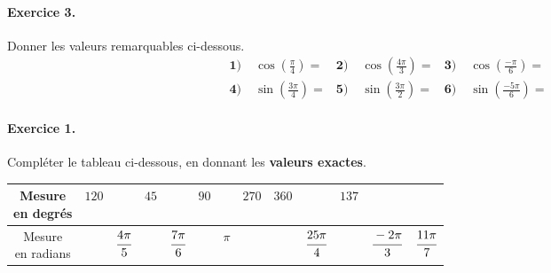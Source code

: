 \documentclass[11pt]{article}
\begin{document}
\paragraph{Exercice 3.} Donner les valeurs remarquables ci-dessous.
\begin{align*}
  \textbf{1)}\; & \cos\left( \frac{\pi}{4} \right) = &
  \textbf{2)}\; & \cos\left( \frac{4\pi}{3} \right) = &
  \textbf{3)}\; & \cos\left( \frac{-\pi}{6} \right) = \\
  \textbf{4)}\; & \sin\left( \frac{3\pi}{4} \right) = &
  \textbf{5)}\; & \sin\left( \frac{3\pi}{2} \right) = &
  \textbf{6)}\; & \sin\left( \frac{-5\pi}{6} \right) =
\end{align*}

\vspace{1cm}

\paragraph{Exercice 1.}
Compléter le tableau ci-dessous, en donnant les \textbf{valeurs exactes}.
\def\arraystretch{2}
\begin{center}
\begin{tabular}{|c|c|c|c|c|c|c|c|c|c|c|c|c|}
  \hline
  \makecell{Mesure\\en degrés} & $120$ & & $45$ &  & $90$ & \phantom{$180$} &
  $270$ & $360$ & & $137$ & & \\
  \hline
  \makecell{Mesure\\en radians} & & $\cfrac{4\pi}{5}$ & & $\cfrac{7\pi}{6}$ & &
  $\pi$ & & & $\cfrac{25\pi}{4}$ & & $\cfrac{-2\pi}{3}$ & $\cfrac{11\pi}{7}$\\
  \hline
\end{tabular}
\end{center}
\end{document}
